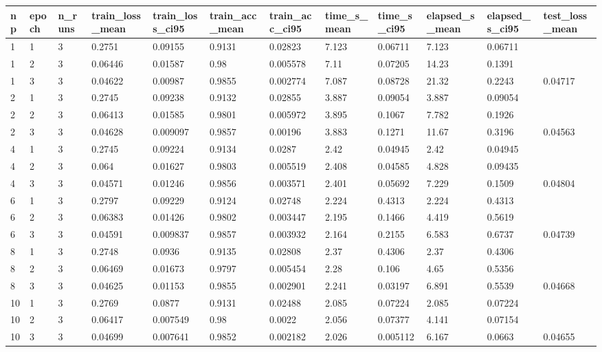 \begin{tabular}{llllllllllll}
\hline
np & epoch & n\_runs & train\_loss\_mean & train\_loss\_ci95 & train\_acc\_mean & train\_acc\_ci95 & time\_s\_mean & time\_s\_ci95 & elapsed\_s\_mean & elapsed\_s\_ci95 & test\_loss\_mean \\
\hline
1 & 1 & 3 & 0.2751 & 0.09155 & 0.9131 & 0.02823 & 7.123 & 0.06711 & 7.123 & 0.06711 &  \\
1 & 2 & 3 & 0.06446 & 0.01587 & 0.98 & 0.005578 & 7.11 & 0.07205 & 14.23 & 0.1391 &  \\
1 & 3 & 3 & 0.04622 & 0.00987 & 0.9855 & 0.002774 & 7.087 & 0.08728 & 21.32 & 0.2243 & 0.04717 \\
2 & 1 & 3 & 0.2745 & 0.09238 & 0.9132 & 0.02855 & 3.887 & 0.09054 & 3.887 & 0.09054 &  \\
2 & 2 & 3 & 0.06413 & 0.01585 & 0.9801 & 0.005972 & 3.895 & 0.1067 & 7.782 & 0.1926 &  \\
2 & 3 & 3 & 0.04628 & 0.009097 & 0.9857 & 0.00196 & 3.883 & 0.1271 & 11.67 & 0.3196 & 0.04563 \\
4 & 1 & 3 & 0.2745 & 0.09224 & 0.9134 & 0.0287 & 2.42 & 0.04945 & 2.42 & 0.04945 &  \\
4 & 2 & 3 & 0.064 & 0.01627 & 0.9803 & 0.005519 & 2.408 & 0.04585 & 4.828 & 0.09435 &  \\
4 & 3 & 3 & 0.04571 & 0.01246 & 0.9856 & 0.003571 & 2.401 & 0.05692 & 7.229 & 0.1509 & 0.04804 \\
6 & 1 & 3 & 0.2797 & 0.09229 & 0.9124 & 0.02748 & 2.224 & 0.4313 & 2.224 & 0.4313 &  \\
6 & 2 & 3 & 0.06383 & 0.01426 & 0.9802 & 0.003447 & 2.195 & 0.1466 & 4.419 & 0.5619 &  \\
6 & 3 & 3 & 0.04591 & 0.009837 & 0.9857 & 0.003932 & 2.164 & 0.2155 & 6.583 & 0.6737 & 0.04739 \\
8 & 1 & 3 & 0.2748 & 0.0936 & 0.9135 & 0.02808 & 2.37 & 0.4306 & 2.37 & 0.4306 &  \\
8 & 2 & 3 & 0.06469 & 0.01673 & 0.9797 & 0.005454 & 2.28 & 0.106 & 4.65 & 0.5356 &  \\
8 & 3 & 3 & 0.04625 & 0.01153 & 0.9855 & 0.002901 & 2.241 & 0.03197 & 6.891 & 0.5539 & 0.04668 \\
10 & 1 & 3 & 0.2769 & 0.0877 & 0.9131 & 0.02488 & 2.085 & 0.07224 & 2.085 & 0.07224 &  \\
10 & 2 & 3 & 0.06417 & 0.007549 & 0.98 & 0.0022 & 2.056 & 0.07377 & 4.141 & 0.07154 &  \\
10 & 3 & 3 & 0.04699 & 0.007641 & 0.9852 & 0.002182 & 2.026 & 0.005112 & 6.167 & 0.0663 & 0.04655 \\
\hline
\end{tabular}
